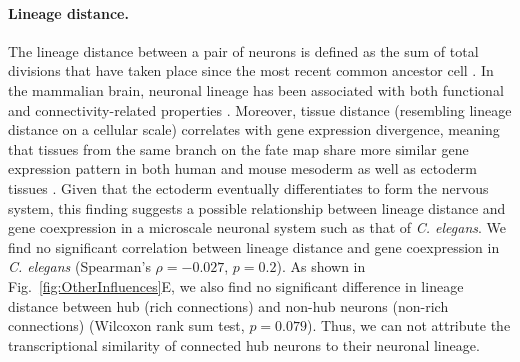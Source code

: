 \documentclass[10pt,letterpaper]{article}
\begin{document}
{\paragraph{Lineage distance.}
The lineage distance between a pair of neurons is defined as the sum of total divisions that have taken place since the most recent common ancestor cell \cite{Pavlovic:2014gx, Sulston1977, Sulston1983}.
In the mammalian brain, neuronal lineage has been associated with both functional \cite{Ciceri2013, Li2012} and connectivity-related properties \cite{Yu2012}.
Moreover, tissue distance (resembling lineage distance on a cellular scale) correlates with gene expression divergence, meaning that tissues from the same branch on the fate map share more similar gene expression pattern in both human and mouse mesoderm as well as ectoderm tissues \cite{Cui2007}.
Given that the ectoderm eventually differentiates to form the nervous system, this finding suggests a possible relationship between lineage distance and gene coexpression in a microscale neuronal system such as that of \textit{C. elegans}.
We find no significant correlation between lineage distance and gene coexpression in \textit{C. elegans} (Spearman's $\rho = -0.027$, $p = 0.2$).
As shown in Fig.~\ref{fig:OtherInfluences}E, we also find no significant difference in lineage distance between hub (rich connections) and non-hub neurons (non-rich connections) (Wilcoxon rank sum test, $p = 0.079$).
Thus, we can not attribute the transcriptional similarity of connected hub neurons to their neuronal lineage.

}
\end{document}
